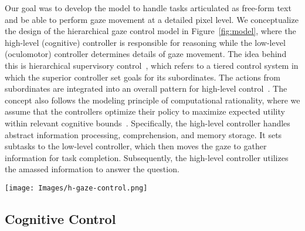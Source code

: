 Our goal was to develop the model \name to handle tasks articulated as free-form text and be able to perform gaze movement at a detailed pixel level.
We conceptualize the design of the hierarchical gaze control model in Figure~\ref{fig:model}, where the high-level (cognitive) controller is responsible for reasoning while the low-level (oculomotor) controller determines details of gaze movement. 
The idea behind this is hierarchical supervisory control~\cite{eppe2022intelligent}, which refers to a tiered control system in which the superior controller set goals for its subordinates. The actions from subordinates are integrated into an overall pattern for high-level control~\cite{pew1966acquisition}.
The concept also follows the modeling principle of computational rationality, where we assume that the controllers optimize their policy to maximize expected utility within relevant cognitive bounds~\cite{oulasvirta2022computational,chandramouli2024workflow}.
Specifically, the high-level controller handles abstract information processing, comprehension, and memory storage. 
It sets subtasks to the low-level controller, which then moves the gaze to gather information for task completion. Subsequently, the high-level controller utilizes the amassed information to answer the question.

\begin{figure*}[!t]
\centering
  \texttt{[image: Images/h-gaze-control.png]}
  \caption{\textbf{An overview of the hierarchical eye-movement control architecture.} When presented with a chart and a task, a cognitive controller, powered by large language models, makes decisions on what to look at next and judges whether it is confident enough to provide an answer to the task's question. It relies on internal memory, which summarizes the information gathered from the chart through eye movements. Once cognitive control has determined the next action, the oculomotor controller is responsible for moving the gaze and observing the chart through a limited vision field. The model's objective is to accurately address the task as quickly as possible within set cognitive and physical constraints.}
  \label{fig:model}
\end{figure*}

\subsection{Cognitive Control}

